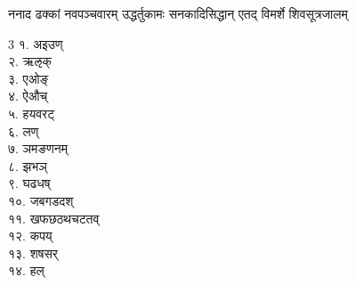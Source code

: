\Large
\sectionmark{\mbox{}}
\begin{center}


\clearpage

{ननाद ढक्कां नवपञ्चवारम्}
{उद्धर्तुकामः सनकादिसिद्धान्}
{एतद् विमर्शे शिवसूत्रजालम्}
\end{center}
 \setlength{\columnseprule}{0pt}

\begin{multicols}{3}
१. अइउण्\\
२. ऋऌक्\\
३. एओङ्\\
४. ऐऔच्\\
५. हयवरट्\\
६. लण्\\
७. ञमङणनम्\\
८. झभञ्\\
९. घढधष्\\
१०. जबगडदश्\\
११. खफछठथ\-चटतव्\\
१२. कपय्\\
१३. शषसर्\\
१४. हल्
\end{multicols}
